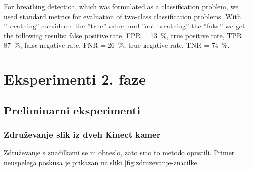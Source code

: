 For breathing detection, which was formulated as a classification problem, we used standard metrics for evaluation of two-class classification problems. With ''breathing'' considered the ''true'' value, and ''not breathing'' the ''false'' we get the following results: false positive rate, FPR = \SI{13}{\%}, true positive rate, TPR = \SI{87}{\%}, false negative rate, FNR = \SI{26}{\%}, true negative rate, TNR = \SI{74}{\%}.































\section{Eksperimenti 2. faze}










\subsection{Preliminarni eksperimenti}





\subsubsection{Združevanje slik iz dveh Kinect kamer}\label{sec:rezultati-zdruzevanje}
Združevanje s značilkami se ni obneslo, zato smo to metodo opustili. Primer neuspelega poskusa je prikazan na sliki \ref{fig:zdruzevanje-znacilke}.

